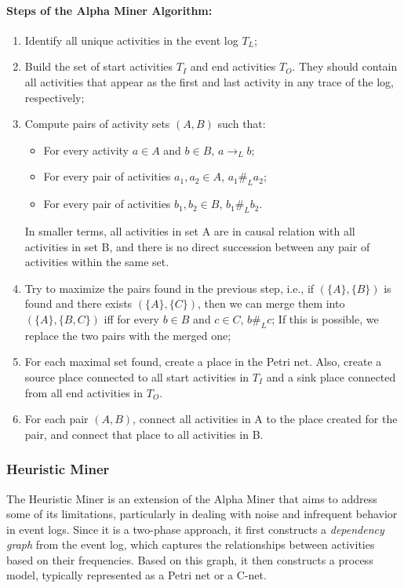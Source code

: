 \paragraph{Steps of the Alpha Miner Algorithm:}
\begin{enumerate}
    \item Identify all unique activities in the event log $T_L$;
    \item Build the set of start activities $T_I$ and end activities $T_O$. They should contain all activities that appear as the first and last activity in any trace of the log, respectively;
    \item Compute pairs of activity sets $(A,B)$ such that:
    \begin{itemize}
        \item For every activity $a \in A$ and $b \in B$, $a \to_L b$;
        \item For every pair of activities $a_1, a_2 \in A$, $a_1 \#_L a_2$;
        \item For every pair of activities $b_1, b_2 \in B$, $b_1 \#_L b_2$.
    \end{itemize}
    In smaller terms, all activities in set A are in causal relation with all activities in set B, and there is no direct succession between any pair of activities within the same set.
    \item Try to maximize the pairs found in the previous step, i.e., if $(\{A\},\{B\})$ is found and there exists $(\{A\}, \{C\})$, then we can merge them into $(\{A\}, \{B,C\})$ iff for every $b \in B$ and $c \in C$, $b \#_L c$;
    If this is possible, we replace the two pairs with the merged one;
    \item For each maximal set found, create a place in the Petri net. Also, create a source place connected to all start activities in $T_I$ and a sink place connected from all end activities in $T_O$.
    \item For each pair $(A,B)$, connect all activities in A to the place created for the pair, and connect that place to all activities in B.
\end{enumerate}

\subsubsection{Heuristic Miner}
The Heuristic Miner is an extension of the Alpha Miner that aims to address some of its limitations, particularly in dealing with noise and infrequent behavior in event logs.
Since it is a two-phase approach, it first constructs a \textit{dependency graph} from the event log, which captures the relationships between activities based on their frequencies.
Based on this graph, it then constructs a process model, typically represented as a Petri net or a C-net.
